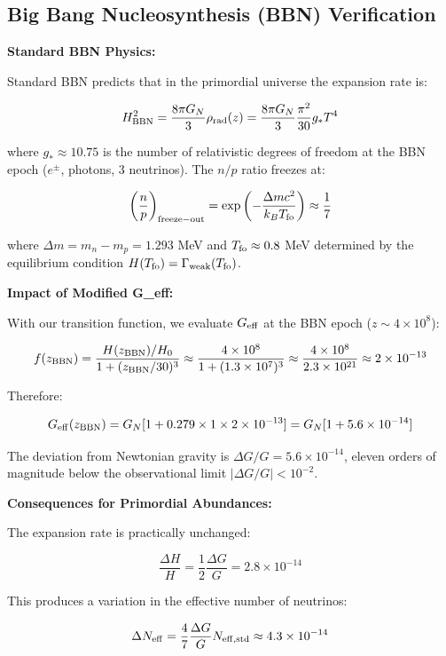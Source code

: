 \documentclass[11pt,a4paper]{article}
\begin{document}
\hypertarget{big-bang-nucleosynthesis-bbn-verification}{%
\subsection{Big Bang Nucleosynthesis (BBN)
Verification}\label{big-bang-nucleosynthesis-bbn-verification}}

\textbf{Standard BBN Physics:}

Standard BBN predicts that in the primordial universe the expansion rate
is:

\[H^2_{\rm BBN} = \frac{8\pi G_N}{3}\rho_{\rm rad}(z) = \frac{8\pi G_N}{3} \frac{\pi^2}{30} g_* T^4\]

where \(g_* \approx 10.75\) is the number of relativistic degrees of
freedom at the BBN epoch (\(e^\pm\), photons, 3 neutrinos). The \(n/p\)
ratio freezes at:

\[\left(\frac{n}{p}\right)_{\rm freeze-out} = \exp\left(-\frac{\Delta m c^2}{k_B T_{\rm fo}}\right) \approx \frac{1}{7}\]

where \(\Delta m = m_n - m_p = 1.293\) MeV and
\(T_{\rm fo} \approx 0.8\) MeV determined by the equilibrium condition
\(H(T_{\rm fo}) = \Gamma_{\rm weak}(T_{\rm fo})\).

\textbf{Impact of Modified G\_eff:}

With our transition function, we evaluate \(G_{\rm eff}\) at the BBN
epoch (\(z \sim 4 \times 10^8\)):

\[f(z_{\rm BBN}) = \frac{H(z_{\rm BBN})/H_0}{1 + (z_{\rm BBN}/30)^3} \approx \frac{4 \times 10^8}{1 + (1.3 \times 10^7)^3} \approx \frac{4 \times 10^8}{2.3 \times 10^{21}} \approx 2 \times 10^{-13}\]

Therefore:

\[G_{\rm eff}(z_{\rm BBN}) = G_N[1 + 0.279 \times 1 \times 2\times10^{-13}] = G_N[1 + 5.6\times10^{-14}]\]

The deviation from Newtonian gravity is
\(\Delta G/G = 5.6 \times 10^{-14}\), eleven orders of magnitude below
the observational limit \(|\Delta G/G| < 10^{-2}\).

\textbf{Consequences for Primordial Abundances:}

The expansion rate is practically unchanged:

\[\frac{\Delta H}{H} = \frac{1}{2}\frac{\Delta G}{G} = 2.8 \times 10^{-14}\]

This produces a variation in the effective number of neutrinos:

\[\Delta N_{\rm eff} = \frac{4}{7}\frac{\Delta G}{G} N_{\rm eff,std} \approx 4.3 \times 10^{-14}\]
\end{document}
